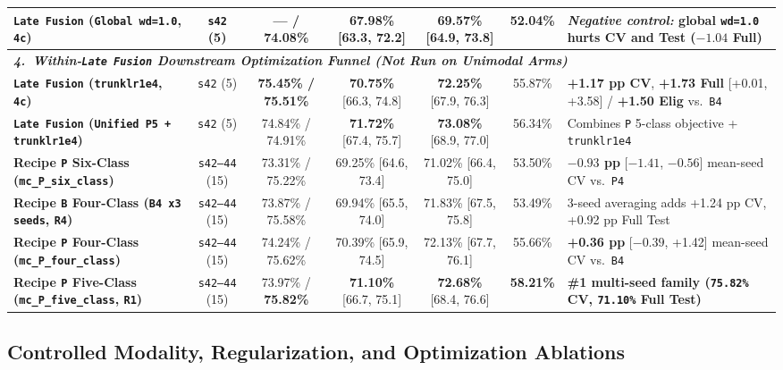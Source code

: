 \documentclass[10pt,a4paper,twocolumn]{article}
\begin{document}
\begin{table}[t!]
\begin{tabular}{lcccccl}
    \textbf{\texttt{Late Fusion} (\texttt{Global wd=1.0}, \texttt{4c})} & \texttt{s42} (5) & --- / 74.08\% & 67.98\% [63.3, 72.2] & 69.57\% [64.9, 73.8] & 52.04\% & \textit{Negative control:} global \texttt{wd=1.0} hurts CV and Test ($-1.04$ Full) \\
    \midrule
    \multicolumn{7}{l}{\textit{\textbf{4.\ Within-\texttt{Late Fusion} Downstream Optimization Funnel (Not Run on Unimodal Arms)}}} \\
    \textbf{\texttt{Late Fusion} (\texttt{trunklr1e4}, \texttt{4c})} & \texttt{s42} (5) & \textbf{75.45\% / 75.51\%} & \textbf{70.75\%} [66.3, 74.8] & \textbf{72.25\%} [67.9, 76.3] & 55.87\% & \textbf{+1.17 pp CV}, \textbf{+1.73 Full} [+0.01, +3.58] / \textbf{+1.50 Elig} vs.\ \texttt{B4} \\
    \textbf{\texttt{Late Fusion} (\texttt{Unified P5 + trunklr1e4})} & \texttt{s42} (5) & 74.84\% / 74.91\% & \textbf{71.72\%} [67.4, 75.7] & \textbf{73.08\%} [68.9, 77.0] & 56.34\% & Combines \texttt{P} 5-class objective + \texttt{trunklr1e4} \\
    \textbf{Recipe \texttt{P} Six-Class (\texttt{mc\_P\_six\_class})} & \texttt{s42--44} (15) & 73.31\% / 75.22\% & 69.25\% [64.6, 73.4] & 71.02\% [66.4, 75.0] & 53.50\% & \textbf{$-0.93$ pp} [$-1.41$, $-0.56$] mean-seed CV vs.\ \texttt{P4} \\
    \textbf{Recipe \texttt{B} Four-Class (\texttt{B4 x3 seeds}, \texttt{R4})} & \texttt{s42--44} (15) & 73.87\% / 75.58\% & 69.94\% [65.5, 74.0] & 71.83\% [67.5, 75.8] & 53.49\% & 3-seed averaging adds +1.24 pp CV, +0.92 pp Full Test \\
    \textbf{Recipe \texttt{P} Four-Class (\texttt{mc\_P\_four\_class})} & \texttt{s42--44} (15) & 74.24\% / 75.62\% & 70.39\% [65.9, 74.5] & 72.13\% [67.7, 76.1] & 55.66\% & \textbf{+0.36 pp} [$-0.39$, +1.42] mean-seed CV vs.\ \texttt{B4} \\
    \textbf{Recipe \texttt{P} Five-Class (\texttt{mc\_P\_five\_class}, \texttt{R1})} & \texttt{s42--44} (15) & 73.97\% / \textbf{75.82\%} & \textbf{71.10\%} [66.7, 75.1] & \textbf{72.68\%} [68.4, 76.6] & \textbf{58.21\%} & \textbf{\#1 multi-seed family (\texttt{75.82\%} CV, \texttt{71.10\%} Full Test)} \\
    \bottomrule
  \end{tabular}
\end{table}

\subsection{Controlled Modality, Regularization, and Optimization Ablations}
\end{document}
